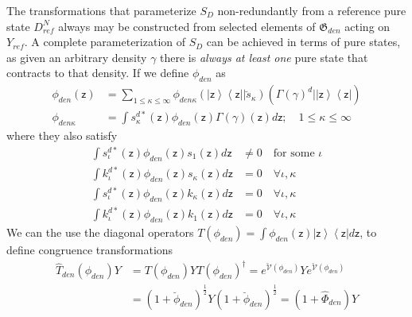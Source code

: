 \documentclass[aps,preprint]{revtex4}%
\begin{document}
The transformations that parameterize $S_{D}$ non-redundantly from a reference
pure state $D_{ref}^{N}$ always may be constructed from selected elements of
$\mathfrak{G}_{den}$ acting on $Y_{ref}$. A complete parameterization of
$S_{D}$ can be achieved in terms of pure states, as given an arbitrary density
$\gamma$ there is \emph{always at least one} pure state that contracts to that
density. If we define $\phi_{den}$ as
\begin{align}
\phi_{den}\left(  \mathsf{z}\right)   &  =\sum_{1\leq\kappa\leq\infty}%
\phi_{den\kappa}\left(  \left|  \mathsf{z}\right\rangle \left\langle
\mathsf{z}\right|  |\breve{s}_{\kappa}\right)  \left(  \Gamma\left(
\gamma\right)  ^{d}|\left|  \mathsf{z}\right\rangle \left\langle
\mathsf{z}\right|  \right) \nonumber\\
\phi_{den\kappa}  &  =\int s_{\kappa}^{d\ast}\left(  \mathsf{z}\right)
\phi_{den}\left(  \mathsf{z}\right)  \Gamma\left(  \gamma\right)  \left(
\mathsf{z}\right)  d\mathsf{z};\quad1\leq\kappa\leq\infty
\end{align}
where they also satisfy
\begin{align}
\int s_{\iota}^{d\ast}\left(  \mathsf{z}\right)  \phi_{den}\left(
\mathsf{z}\right)  s_{1}\left(  \mathsf{z}\right)  d\mathsf{z}  &  \neq
0\quad\text{for some }\iota\nonumber\\
\int k_{\iota}^{d\ast}\left(  \mathsf{z}\right)  \phi_{den}\left(
\mathsf{z}\right)  s_{\kappa}\left(  \mathsf{z}\right)  d\mathsf{z}  &
=0\quad\forall\iota,\kappa\nonumber\\
\int s_{\iota}^{d\ast}\left(  \mathsf{z}\right)  \phi_{den}\left(
\mathsf{z}\right)  k_{\kappa}\left(  \mathsf{z}\right)  d\mathsf{z}  &
=0\quad\forall\iota,\kappa\nonumber\\
\int k_{\iota}^{d\ast}\left(  \mathsf{z}\right)  \phi_{den}\left(
\mathsf{z}\right)  k_{1}\left(  \mathsf{z}\right)  d\mathsf{z}  &
=0\quad\forall\iota,\kappa
\end{align}
We can the use the diagonal operators $T\left(  \phi_{den}\right)  =\int
\phi_{den}\left(  \mathsf{z}\right)  \left|  \mathsf{z}\right\rangle
\left\langle \mathsf{z}\right|  d\mathsf{z}$, to define congruence
transformations%
\begin{align}
\hat{T}_{den}\left(  \phi_{den}\right)  Y  &  =T\left(  \phi_{den}\right)
YT\left(  \phi_{den}\right)  ^{\dagger}=e^{\mathcal{\breve{V}}\left(
\phi_{den}\right)  }Ye^{\mathcal{\breve{V}}\left(  \phi_{den}\right)
}\nonumber\\
&  =\left(  1+\breve{\phi}_{den}\right)  ^{\frac{1}{2}}Y\left(  1+\breve{\phi
}_{den}\right)  ^{\frac{1}{2}}=\left(  1+\hat{\Phi}_{den}\right)  Y
\end{align}
\end{document}
